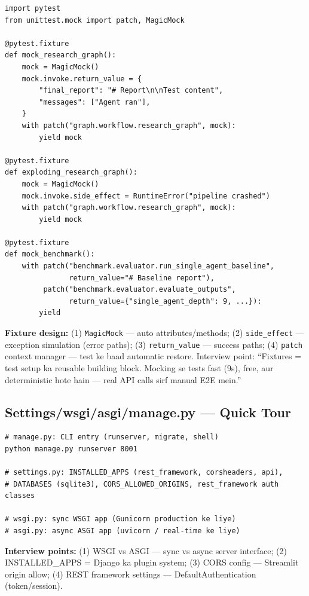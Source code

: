 \begin{codestorybox}
\begin{lstlisting}[style=pythonstyle, caption={conftest.py --- fixtures}]
import pytest
from unittest.mock import patch, MagicMock

@pytest.fixture
def mock_research_graph():
    mock = MagicMock()
    mock.invoke.return_value = {
        "final_report": "# Report\n\nTest content",
        "messages": ["Agent ran"],
    }
    with patch("graph.workflow.research_graph", mock):
        yield mock

@pytest.fixture
def exploding_research_graph():
    mock = MagicMock()
    mock.invoke.side_effect = RuntimeError("pipeline crashed")
    with patch("graph.workflow.research_graph", mock):
        yield mock

@pytest.fixture
def mock_benchmark():
    with patch("benchmark.evaluator.run_single_agent_baseline",
               return_value="# Baseline report"),
         patch("benchmark.evaluator.evaluate_outputs",
               return_value={"single_agent_depth": 9, ...}):
        yield
\end{lstlisting}

\textbf{Fixture design:} (1) \texttt{MagicMock} --- auto attributes/methods; (2) \texttt{side\_effect} --- exception simulation (error paths); (3) \texttt{return\_value} --- success paths; (4) \texttt{patch} context manager --- test ke baad automatic restore. Interview point: ``Fixtures = test setup ka reusable building block. Mocking se tests fast (9s), free, aur deterministic hote hain --- real API calls sirf manual E2E mein.''
\end{codestorybox}

\subsection{Settings/wsgi/asgi/manage.py --- Quick Tour}

\begin{codestorybox}
\begin{lstlisting}[style=bashstyle, caption={Django entry files}]
# manage.py: CLI entry (runserver, migrate, shell)
python manage.py runserver 8001

# settings.py: INSTALLED_APPS (rest_framework, corsheaders, api),
# DATABASES (sqlite3), CORS_ALLOWED_ORIGINS, rest_framework auth classes

# wsgi.py: sync WSGI app (Gunicorn production ke liye)
# asgi.py: async ASGI app (uvicorn / real-time ke liye)
\end{lstlisting}

\textbf{Interview points:} (1) WSGI vs ASGI --- sync vs async server interface; (2) INSTALLED\_APPS = Django ka plugin system; (3) CORS config --- Streamlit origin allow; (4) REST framework settings --- DefaultAuthentication (token/session).
\end{codestorybox}

